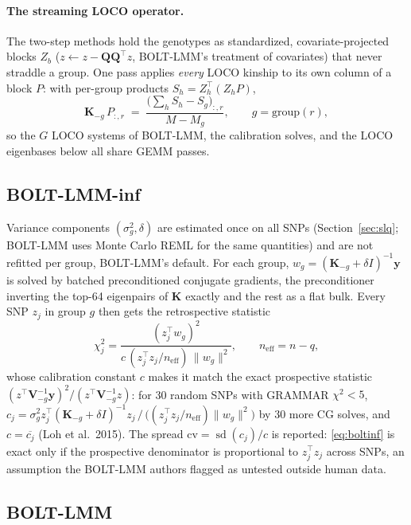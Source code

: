 \documentclass[11pt]{article}
\newcommand{\y}{\mathbf{y}}
\newcommand{\K}{\mathbf{K}}
\newcommand{\Q}{\mathbf{Q}}
\newcommand{\V}{\mathbf{V}}
\begin{document}
\paragraph{The streaming LOCO operator.} The two-step methods hold the
genotypes as standardized, covariate-projected blocks
$Z_b$ ($z \gets z - \Q\Q^\top z$, BOLT-LMM's treatment of covariates)
that never straddle a group. One pass applies \emph{every} LOCO kinship
to its own column of a block $P$: with per-group products
$S_h = Z_h^\top(Z_h P)$,
\begin{equation}
  \K_{-g}\,P_{:,r} \;=\; \frac{\big(\textstyle\sum_h S_h - S_g\big)_{:,r}}{M - M_g},
  \qquad g = \text{group}(r),
  \label{eq:locoop}
\end{equation}
so the $G$ LOCO systems of BOLT-LMM, the calibration solves, and the
LOCO eigenbases below all share GEMM passes.

\subsection{BOLT-LMM-inf}

Variance components $(\sigma_g^2, \delta)$ are estimated once on all
SNPs (Section~\ref{sec:slq}; BOLT-LMM uses Monte Carlo REML for the same
quantities) and are not refitted per group, BOLT-LMM's default. For
each group, $w_g = (\K_{-g} + \delta I)^{-1}\y$ is solved by batched
preconditioned conjugate gradients, the preconditioner inverting the
top-64 eigenpairs of $\K$ exactly and the rest as a flat bulk. Every
SNP $z_j$ in group $g$ then gets the retrospective statistic
\begin{equation}
  \chi^2_j = \frac{(z_j^\top w_g)^2}{c\,(z_j^\top z_j / n_{\mathrm{eff}})\,\|w_g\|^2},
  \qquad n_{\mathrm{eff}} = n - q,
  \label{eq:boltinf}
\end{equation}
whose calibration constant $c$ makes it match the exact prospective
statistic
$(z^\top \V_{-g}^{-1}\y)^2 / (z^\top \V_{-g}^{-1} z)$: for 30 random SNPs
with GRAMMAR $\chi^2 < 5$, $c_j = \sigma_g^2 z_j^\top(\K_{-g}+\delta I)^{-1}z_j
\,/\,\big((z_j^\top z_j/n_{\mathrm{eff}})\|w_g\|^2\big)$ by 30 more CG
solves, and $c = \overline{c_j}$ (Loh et al.\ 2015). The spread
$\mathrm{cv} = \operatorname{sd}(c_j)/c$ is reported: \eqref{eq:boltinf}
is exact only if the prospective denominator is proportional to
$z_j^\top z_j$ across SNPs, an assumption the BOLT-LMM authors flagged as
untested outside human data.

\subsection{BOLT-LMM}
\end{document}
